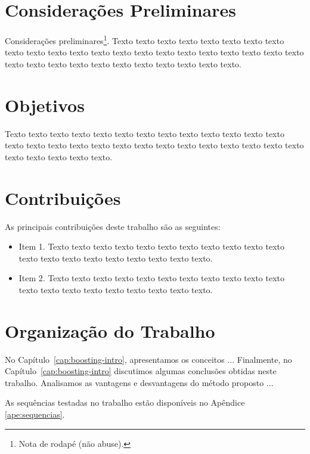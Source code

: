 \section{Considerações Preliminares}
\label{sec:consideracoes_preliminares}

Considerações preliminares\footnote{Nota de rodapé (não abuse).}.
Texto texto texto texto texto texto texto texto texto texto texto texto texto
texto texto texto texto texto texto texto texto texto texto texto texto texto
texto texto texto texto texto texto texto.
 

\section{Objetivos}
\label{sec:objetivo}

Texto texto texto texto texto texto texto texto texto texto texto texto texto
texto texto texto texto texto texto texto texto texto texto texto texto texto
texto texto texto texto texto texto.

\section{Contribuições}
\label{sec:contribucoes}

As principais contribuições deste trabalho são as seguintes:

\begin{itemize}
  \item Item 1. Texto texto texto texto texto texto texto texto texto texto
  texto texto texto texto texto texto texto texto texto texto.

  \item Item 2. Texto texto texto texto texto texto texto texto texto texto
  texto texto texto texto texto texto texto texto texto texto.

\end{itemize}

\section{Organização do Trabalho}
\label{sec:organizacao_trabalho}

No Capítulo~\ref{cap:boosting-intro}, apresentamos os conceitos ... Finalmente, no
Capítulo~\ref{cap:boosting-intro} discutimos algumas conclusões obtidas neste
trabalho. Analisamos as vantagens e desvantagens do método proposto ... 

As sequências testadas no trabalho estão disponíveis no Apêndice \ref{ape:sequencias}.
